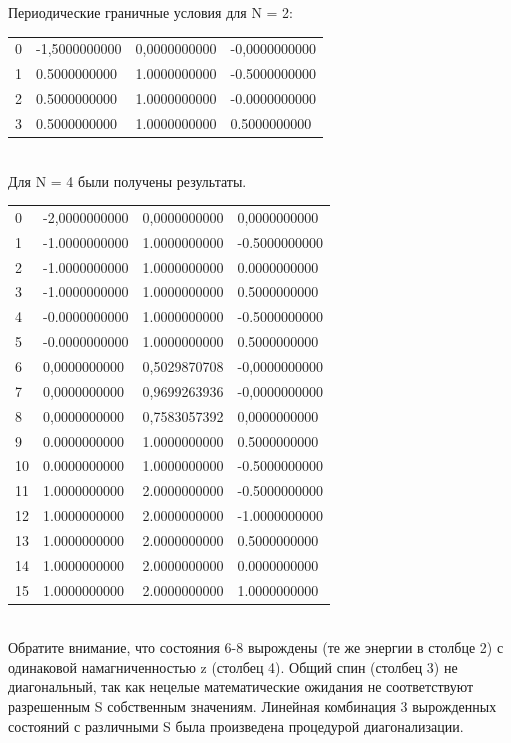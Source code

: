 \documentclass[11pt]{article}
\begin{document}
Периодические граничные условия для N = 2:\\
\begin{tabular}{llll}
    0 & -1,5000000000 & 0,0000000000 & -0,0000000000 \\
    1 & 0.5000000000 & 1.0000000000 & -0.5000000000 \\
    2 & 0.5000000000 & 1.0000000000 & -0.0000000000 \\ 
    3 & 0.5000000000 & 1.0000000000 & 0.5000000000 \\
\end{tabular}\\

Для N = 4 были получены результаты.  \\
\begin{tabular}{llll}
    0 & -2,0000000000 & 0,0000000000 & 0,0000000000 \\
    1 & -1.0000000000 & 1.0000000000 & -0.5000000000 \\
    2 & -1.0000000000 & 1.0000000000 & 0.0000000000 \\
    3 & -1.0000000000 & 1.0000000000 & 0.5000000000 \\
    4 & -0.0000000000 & 1.0000000000 & -0.5000000000 \\
    5 & -0.0000000000 & 1.0000000000 & 0.5000000000 \\
    6 & 0,0000000000 & 0,5029870708 & -0,0000000000 \\
    7 & 0,0000000000 & 0,9699263936 & -0,0000000000 \\
    8 & 0,0000000000 & 0,7583057392 & 0,0000000000 \\
    9 & 0.0000000000 & 1.0000000000 & 0.5000000000 \\
   10 & 0.0000000000 & 1.0000000000 & -0.5000000000 \\
   11 & 1.0000000000 & 2.0000000000 & -0.5000000000 \\
   12 & 1.0000000000 & 2.0000000000 & -1.0000000000 \\
   13 & 1.0000000000 & 2.0000000000 & 0.5000000000 \\
   14 & 1.0000000000 & 2.0000000000 & 0.0000000000 \\
   15 & 1.0000000000 & 2.0000000000 & 1.0000000000 \\
\end{tabular} \\

Обратите внимание, что состояния 6-8 вырождены (те же энергии в столбце 2) с одинаковой намагниченностью z (столбец 4). Общий спин (столбец 3) не диагональный, так как нецелые математические ожидания не соответствуют разрешенным S собственным значениям. Линейная комбинация 3 вырожденных состояний с различными S была произведена процедурой диагонализации.\\
\end{document}
